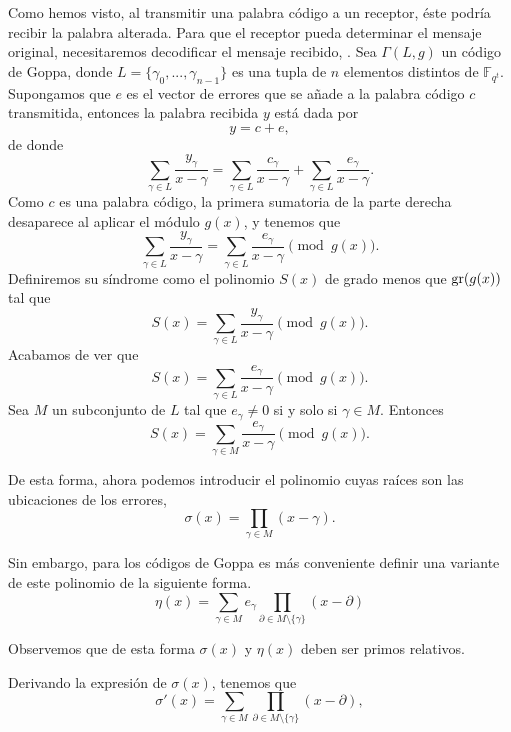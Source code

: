 Como hemos visto, al transmitir una palabra código a un receptor, éste podría recibir la palabra alterada. Para que el receptor pueda determinar el mensaje original, necesitaremos decodificar el mensaje recibido, \cite{Goppa_codes_1973}. Sea $\Gamma(L,g)$ un código de Goppa, donde $L = \{ \gamma_0, ..., \gamma_{n-1} \}$ es una tupla de $n$ elementos distintos de $\mathbb{F}_{q^t}$. Supongamos que $e$ es el vector de errores que se añade a la palabra código $c$ transmitida, entonces la palabra recibida $y$ está dada por
\[
    y = c + e,
\]
de donde 
\[
    \sum_{\gamma \in L} \frac{y_\gamma}{x - \gamma} = \sum_{\gamma \in L} \frac{c_\gamma}{x - \gamma} + \sum_{\gamma \in L} \frac{e_\gamma}{x - \gamma}.
\]
Como $c$ es una palabra código, la primera sumatoria de la parte derecha desaparece al aplicar el módulo $g(x)$, y tenemos que
\[
    \sum_{\gamma \in L} \frac{y_\gamma}{x - \gamma} = \sum_{\gamma \in L} \frac{e_\gamma}{x - \gamma} \pmod{g(x)}.
\]
Definiremos su síndrome como el polinomio $S(x)$ de grado menos que $\operatorname{gr}(g(x))$ tal que 
\[
    S(x) = \sum_{\gamma \in L} \frac{y_\gamma}{x - \gamma} \pmod{g(x)}.
\]
Acabamos de ver que 
\[
    S(x) = \sum_{\gamma \in L} \frac{e_\gamma}{x - \gamma} \pmod{g(x)}.
\]
Sea $M$ un subconjunto de $L$ tal que $e_{\gamma} \neq 0$ si y solo si $\gamma \in M$. Entonces
\begin{equation}
    \label{def:sindrome}
    S(x) = \sum_{\gamma \in M} \frac{e_\gamma}{x - \gamma} \pmod{g(x)}.
\end{equation}

De esta forma, ahora podemos introducir el polinomio cuyas raíces son las ubicaciones de los errores,
\begin{equation}
    \label{def:localizaciones}
    \sigma (x) = \prod_{\gamma \in M} (x - \gamma).
\end{equation}

Sin embargo, para los códigos de Goppa es más conveniente definir una variante de este polinomio de la siguiente forma.
\begin{equation}
    \label{def:eta}
    \eta (x) = \sum_{\gamma \in M} e_\gamma \prod_{\partial \in M \setminus \{ \gamma \} } (x - \partial)
\end{equation}

Observemos que de esta forma $\sigma(x)$ y $\eta(x)$ deben ser primos relativos.

Derivando la expresión de $\sigma(x)$, tenemos que 
\begin{equation}
    \label{def:localizaciones_derivada}
    \sigma'(x) = \sum_{\gamma \in M} \prod_{\partial \in M \setminus \{ \gamma \} } (x - \partial),
\end{equation}

